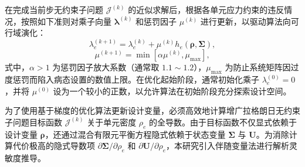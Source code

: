 在完成当前步无约束子问题 $\mathcal{J}^{(k)}$ 的近似求解后，根据各单元应力约束的违反情况，按照如下准则对乘子向量 $\boldsymbol{\lambda}^{(k)}$ 和惩罚因子 $\mu^{(k)}$ 进行更新，以驱动算法向可行域演化：
\[
\lambda_e^{(k+1)} = \lambda_e^{(k)} + \mu^{(k)} h_e(\boldsymbol{\rho}, \boldsymbol{\Sigma}),
\]
\[
\mu^{(k+1)} = \min \left[ \alpha \mu^{(k)}, \mu_{\max} \right],
\]
式中，$\alpha > 1$ 为惩罚因子放大系数（通常取 $1.1 \sim 1.2$），$\mu_{\max}$ 为防止系统矩阵因过度惩罚而陷入病态设置的数值上限。在优化起始阶段，通常初始化乘子 $\lambda_e^{(0)} = 0$，并将 $\mu^{(0)}$ 设为一个较小的正数，以允许算法在初始阶段充分探索设计空间。

为了使用基于梯度的优化算法更新设计变量，必须高效地计算增广拉格朗日无约束子问题目标函数 $\mathcal{J}^{(k)}$ 关于单元密度 $\rho_e$ 的全导数。由于目标函数不仅显式依赖于设计变量 $\boldsymbol{\rho}$，还通过混合有限元平衡方程隐式依赖于状态变量 $\boldsymbol{\Sigma}$ 与 $\boldsymbol{U}$。为消除计算代价极高的隐式导数项 $\partial \boldsymbol{\Sigma} / \partial \rho_e$ 和 $\partial \boldsymbol{U} / \partial \rho_e$，本研究引入伴随变量法进行解析灵敏度推导。

